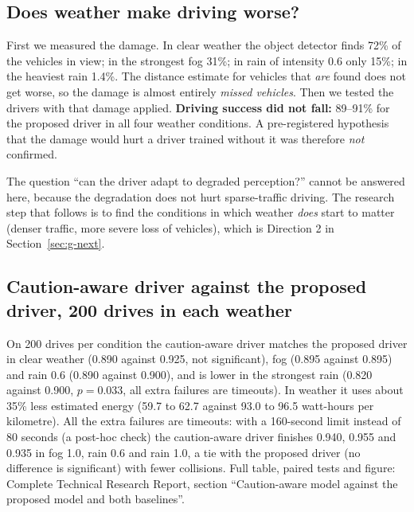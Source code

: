 \subsection{Does weather make driving worse?}
\begin{plainwords}
First we measured the damage. In clear weather the object detector finds 72\% of the vehicles in view; in the strongest fog 31\%; in rain of intensity 0.6 only 15\%; in the heaviest rain 1.4\%. The distance estimate for vehicles that \emph{are} found does not get worse, so the damage is almost entirely \emph{missed vehicles}.
Then we tested the drivers with that damage applied. \textbf{Driving success did not fall:} 89--91\% for the proposed driver in all four weather conditions. A pre-registered hypothesis that the damage would hurt a driver trained without it was therefore \emph{not} confirmed.
\end{plainwords}



\begin{implicationbox}
The question ``can the driver adapt to degraded perception?'' cannot be answered here, because the degradation does not hurt sparse-traffic driving. The research step that follows is to find the conditions in which weather \emph{does} start to matter (denser traffic, more severe loss of vehicles), which is Direction 2 in Section~\ref{sec:g-next}.
\end{implicationbox}

\subsection{Caution-aware driver against the proposed driver, 200 drives in each weather}
On 200 drives per condition the caution-aware driver matches the proposed driver in clear weather (0.890 against 0.925, not significant), fog (0.895 against 0.895) and rain 0.6 (0.890 against 0.900), and is lower in the strongest rain (0.820 against 0.900, $p=0.033$, all extra failures are timeouts). In weather it uses about 35\% less estimated energy (59.7 to 62.7 against 93.0 to 96.5 watt-hours per kilometre). All the extra failures are timeouts: with a 160-second limit instead of 80 seconds (a post-hoc check) the caution-aware driver finishes 0.940, 0.955 and 0.935 in fog 1.0, rain 0.6 and rain 1.0, a tie with the proposed driver (no difference is significant) with fewer collisions. Full table, paired tests and figure: Complete Technical Research Report, section ``Caution-aware model against the proposed model and both baselines''.

